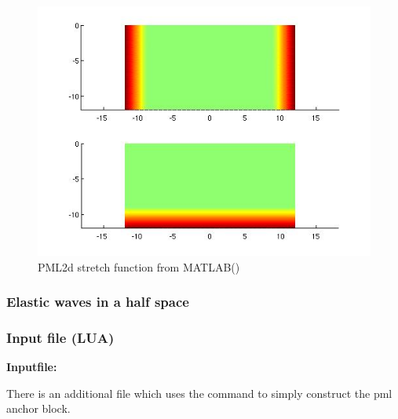 \begin{figure}[htbp]
\begin{minipage}{0.45\linewidth}
    \includegraphics[width=\linewidth]{fig/pml2d_stretch_matlab.jpg}
    \caption{PML2d stretch function from MATLAB()}
    \label{fig:PML2dStretchFunctionMATLAB}
  \end{minipage}
\end{figure}

\clearpage
\subsubsection{Elastic waves in a half space}
\subsubsection*{Input file (LUA)}
\begin{flushleft}
  \textbf{Inputfile:}
  \\
\end{flushleft}
\hspace{1in}
{\footnotesize
{}
}

\clearpage
There is an additional file which uses the 
command to simply construct the pml anchor block.

